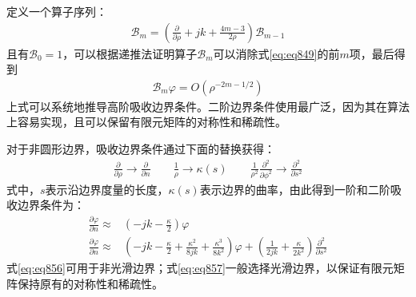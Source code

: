 \documentclass{article}
\numberwithin{equation}{section}
\begin{document}
定义一个算子序列：
\begin{align}
    \label{eq:eq853}
    \mathcal{B}_m=\left(\frac{\partial}{\partial\rho}+jk+\frac{4m-3}{2\rho}\right)\mathcal{B}_{m-1}
\end{align}
且有$\mathcal{B}_0=1$，可以根据递推法证明算子$\mathcal{B}_m$可以消除式\ref{eq:eq849}的前$m$项，最后得到
\begin{align}
    \label{eq:eq854}
    \mathcal{B}_m\varphi=O(\rho^{-2m-1/2})
\end{align}
上式可以系统地推导高阶吸收边界条件。二阶边界条件使用最广泛，因为其在算法上容易实现，且可以保留有限元矩阵的对称性和稀疏性。\par
对于非圆形边界，吸收边界条件通过下面的替换获得：
\begin{align}
    \label{eq:eq855}
    \frac{\partial}{\partial \rho}\to\frac{\partial}{\partial n}\qquad\frac{1}{\rho}\to\kappa(s)\qquad\frac{1}{\rho^2}\frac{\partial^2}{\partial\phi^2}\to\frac{\partial^2}{\partial s^2}
\end{align}
式中，$s$表示沿边界度量的长度，$\kappa(s)$表示边界的曲率，由此得到一阶和二阶吸收边界条件为：
\begin{align}
    \label{eq:eq856}
    \frac{\partial\varphi}{\partial n}\approx&\left(-jk-\frac{\kappa}{2}\right)\varphi \\
    \label{eq:eq857}
    \frac{\partial\varphi}{\partial n}\approx&\left(-jk-\frac{\kappa}{2}+\frac{\kappa^2}{8jk}+\frac{\kappa^3}{8k^2}\right)\varphi+\left(\frac{1}{2jk}+\frac{\kappa}{2k^2}\right)\frac{\partial^2}{\partial s^2}
\end{align}
式\ref{eq:eq856}可用于非光滑边界；式\ref{eq:eq857}一般选择光滑边界，以保证有限元矩阵保持原有的对称性和稀疏性。
\end{document}
